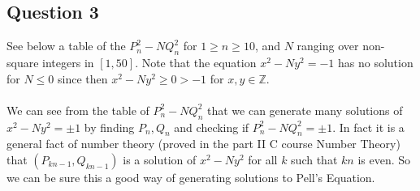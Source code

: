 \documentclass{article}
\begin{document}
\subsection{Question 3}

See below a table of the $P_n^2-NQ_n^2$ for $1\geq n\geq 10$, and $N$ ranging over non-square integers in $[1,50]$.  Note that the equation $x^2-Ny^2=-1$ has no solution for $N\leq 0$ since then $x^2-Ny^2\geq 0>-1$ for $x,y\in \mathbb{Z}$. \\\\

We can see from the table of $P_n^2-NQ_n^2$ that we can generate many solutions of $x^2-Ny^2=\pm 1$ by finding $P_n,Q_n$ and checking if $P_n^2-NQ_n^2=\pm 1$.  In fact it is a general fact of number theory (proved in the part II C course Number Theory) that $(P_{kn-1},Q_{kn-1})$ is a solution of $x^2-Ny^2$ for all $k$ such that $kn$ is even.  So we can be sure this a good way of generating solutions to Pell's Equation.
\end{document}
